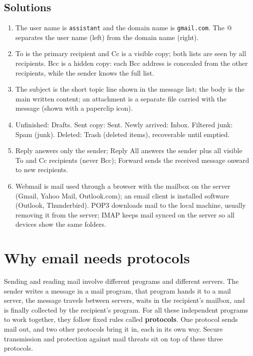 \subsection*{Solutions}
\begingroup\small
\begin{enumerate}[label=\arabic*.]
  \item The user name is \texttt{assistant} and the domain name is
    \texttt{gmail.com}. The @ separates the user name (left) from the domain
    name (right).
  \item To is the primary recipient and Cc is a visible copy; both lists are
    seen by all recipients. Bcc is a hidden copy: each Bcc address is concealed
    from the other recipients, while the sender knows the full list.
  \item The subject is the short topic line shown in the message list; the
    body is the main written content; an attachment is a separate file carried
    with the message (shown with a paperclip icon).
  \item Unfinished: Drafts. Sent copy: Sent. Newly arrived: Inbox. Filtered
    junk: Spam (junk). Deleted: Trash (deleted items), recoverable until
    emptied.
  \item Reply answers only the sender; Reply All answers the sender plus all
    visible To and Cc recipients (never Bcc); Forward sends the received
    message onward to new recipients.
  \item Webmail is mail used through a browser with the mailbox on the
    server (Gmail, Yahoo Mail, Outlook.com); an email client is installed
    software (Outlook, Thunderbird). POP3 downloads mail to the local
    machine, usually removing it from the server; IMAP keeps mail synced on
    the server so all devices show the same folders.
\end{enumerate}
\endgroup

\section{Why email needs protocols}
Sending and reading mail involve different programs and different servers.
The sender writes a message in a mail program, that program hands it to a
mail server, the message travels between servers, waits in the recipient's
mailbox, and is finally collected by the recipient's program. For all these
independent programs to work together, they follow fixed rules called
\textbf{protocols}. One protocol sends mail out, and two other protocols
bring it in, each in its own way. Secure transmission and protection against
mail threats sit on top of these three protocols.

